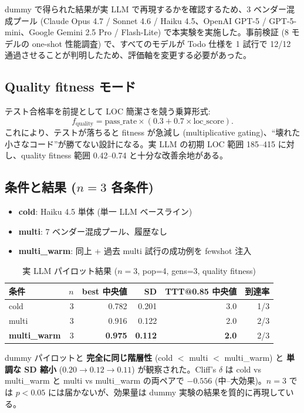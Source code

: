 \documentclass[a4paper,11pt]{ltjsarticle}
\begin{document}
dummy で得られた結果が実 LLM で再現するかを確認するため、3 ベンダー混成プール (Claude Opus 4.7 / Sonnet 4.6 / Haiku 4.5、OpenAI GPT-5 / GPT-5-mini、Google Gemini 2.5 Pro / Flash-Lite) で本実験を実施した。事前検証 (8 モデルの one-shot 性能調査) で、すべてのモデルが Todo 仕様を 1 試行で 12/12 通過させることが判明したため、評価軸を変更する必要があった。

\subsection{Quality fitness モード}

テスト合格率を前提として LOC 簡潔さを競う乗算形式:
\[
f_{\text{quality}} = \text{pass\_rate} \times (0.3 + 0.7 \times \text{loc\_score}).
\]
これにより、テストが落ちると fitness が急減し (multiplicative gating)、``壊れた小さなコード''が勝てない設計になる。実 LLM の初期 LOC 範囲 185--415 に対し、quality fitness 範囲 0.42--0.74 と十分な改善余地がある。

\subsection{条件と結果 ($n=3$ 各条件)}

\begin{itemize}[leftmargin=2em,itemsep=2pt]
  \item \textbf{cold}: Haiku 4.5 単体 (単一 LLM ベースライン)
  \item \textbf{multi}: 7 ベンダー混成プール、履歴なし
  \item \textbf{multi\_warm}: 同上 + 過去 multi 試行の成功例を fewshot 注入
\end{itemize}

\begin{table}[h]\centering
\caption{実 LLM パイロット結果 ($n=3$, pop=4, gens=3, quality fitness)}
\begin{tabular}{@{}lrrrrr@{}}
\toprule
条件 & $n$ & best 中央値 & SD & TTT@0.85 中央値 & 到達率 \\
\midrule
cold        & 3 & 0.782 & 0.201 & 3.0 & 1/3 \\
multi       & 3 & 0.916 & 0.122 & 2.0 & 2/3 \\
\textbf{multi\_warm} & 3 & \textbf{0.975} & \textbf{0.112} & \textbf{2.0} & 2/3 \\
\bottomrule
\end{tabular}
\end{table}

dummy パイロットと \textbf{完全に同じ階層性} (cold $<$ multi $<$ multi\_warm) と \textbf{単調な SD 縮小} ($0.20 \to 0.12 \to 0.11$) が観察された。Cliff's $\delta$ は cold vs multi\_warm と multi vs multi\_warm の両ペアで $-0.556$ (中--大効果)。$n=3$ では $p < 0.05$ には届かないが、効果量は dummy 実験の結果を質的に再現している。
\end{document}

